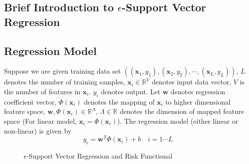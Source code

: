 \documentclass[12pt, draftclsnofoot, onecolumn]{IEEEtran}
\begin{document}
\begin{spacing}{2}



\section{Brief Introduction to $\epsilon$-Support Vector Regression}\label{Introduce epsilon SVR}
\subsection{Regression Model}
Suppose we are given training data set $((\mathbf{x}_{1}, y_{1}),(\mathbf{x}_{2},y_{2}),\cdots,(\mathbf{x}_{L},y_{L}))$, $L$ denotes the number of training samples, $\mathbf{x}_{i}\in \mathbb{R}^{V}$ denotes input data vector, $V$ is the number of features in $\mathbf{x}_{i}$. $y_{i}$ denotes output. Let $\mathbf{w}$ denotes regression coefficient vector, $\Phi(\mathbf{x}_{i})$ denotes the mapping of $\mathbf{x}_{i}$ to higher dimensional feature space, $\mathbf{w},\Phi(\mathbf{x}_{i})\in \mathbb{R}^{\Lambda}$, $\Lambda \in \mathbb{R}$ denotes the dimension of mapped feature space (For linear model, $\mathbf{x}_{i}=\Phi(\mathbf{x}_{i})$). The regression model (either linear or non-linear) is given by 
\begin{equation}
y_{i}=\mathbf{w}^{T}\Phi(\mathbf{x}_{i})+b  \quad i= 1\cdots L 
\label{equation1}
\end{equation} 

\begin{figure}
\centering
\def\svgwidth{\columnwidth}

\caption{$\epsilon$-Support Vector Regression and Risk Functional}
\label{epsilon-SVR}
\end{figure}


\end{spacing}
\end{document}
